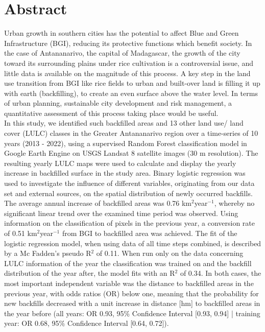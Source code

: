 \documentclass[11pt, A4, oneside]{report}
\begin{document}
\chapter*{Abstract}
Urban growth in southern cities has the potential to affect Blue and Green Infrastructure (BGI), reducing its protective functions which benefit  society. In the case of Antananarivo, the capital of Madagascar, the growth of the city toward its surrounding plains under rice cultivation is a controversial issue, and little data is available on the magnitude of this process. A key step in the land use transition from BGI like rice fields to urban and built-over land is filling it up with earth (backfilling), to create an even surface above the water level. In terms of urban planning, sustainable city development and risk management, a quantitative assessment of this process taking place would be useful.\\
In this study, we identified such backfilled areas and 13 other land use/ land cover (LULC) classes in the Greater Antananarivo region over a time-series of 10 years (2013 - 2022), using a supervised Random Forest classification model in Google Earth Engine  on USGS Landsat 8 satellite images (30 m resolution). The resulting yearly LULC maps were used to calculate and display the yearly increase in backfilled surface in the study area. Binary logistic regression was used to investigate the influence of different variables, originating from our data set and external sources, on the spatial distribution of newly occurred backfills.\\
The average annual increase of backfilled areas was 0.76 km$^2$year$^{-1}$, whereby no significant linear trend over the examined time period was observed. Using information on the classification of pixels in the previous year, a conversion rate of 0.51 km$^2$year$^{-1}$ from BGI to backfilled area was achieved. The fit of the logistic regression model, when using data of all time steps combined, is described by a Mc Fadden's pseudo R$^2$ of 0.11. When run only on the data concerning LULC information of the year the classification was trained on and the backfill distribution of the year after, the model fits with an R$^2$ of 0.34. In both cases, the most important independent variable was the distance to backfilled areas in the previous year, with odds ratios (OR) below one, meaning that the probability for new backfills decreased with a unit increase in distance [hm] to backfilled areas in the year before (all years: OR 0.93, 95\% Confidence Interval [0.93, 0.94] | training year: OR 0.68, 95\% Confidence Interval [0.64, 0.72]).\\
\end{document}
